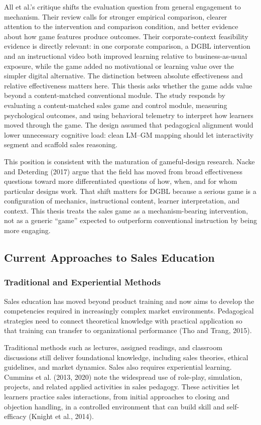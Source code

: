 \documentclass[12pt]{report}
\begin{document}
All et al.'s critique shifts the evaluation question from general engagement to mechanism. Their review calls for stronger empirical comparison, clearer attention to the intervention and comparison condition, and better evidence about how game features produce outcomes. Their corporate-context feasibility evidence is directly relevant: in one corporate comparison, a DGBL intervention and an instructional video both improved learning relative to business-as-usual exposure, while the game added no motivational or learning value over the simpler digital alternative. The distinction between absolute effectiveness and relative effectiveness matters here. This thesis asks whether the game adds value beyond a content-matched conventional module. The study responds by evaluating a content-matched sales game and control module, measuring psychological outcomes, and using behavioral telemetry to interpret how learners moved through the game. The design assumed that pedagogical alignment would lower unnecessary cognitive load: clean LM--GM mapping should let interactivity segment and scaffold sales reasoning.

This position is consistent with the maturation of gameful-design research. Nacke and Deterding (2017) argue that the field has moved from broad effectiveness questions toward more differentiated questions of how, when, and for whom particular designs work. That shift matters for DGBL because a serious game is a configuration of mechanics, instructional content, learner interpretation, and context. This thesis treats the sales game as a mechanism-bearing intervention, not as a generic ``game'' expected to outperform conventional instruction by being more engaging.

\subsection{Current Approaches to Sales Education}

\subsubsection{Traditional and Experiential Methods}
Sales education has moved beyond product training and now aims to develop the competencies required in increasingly complex market environments. Pedagogical strategies need to connect theoretical knowledge with practical application so that training can transfer to organizational performance (Tho and Trang, 2015).

Traditional methods such as lectures, assigned readings, and classroom discussions still deliver foundational knowledge, including sales theories, ethical guidelines, and market dynamics. Sales also requires experiential learning. Cummins et al. (2013, 2020) note the widespread use of role-play, simulation, projects, and related applied activities in sales pedagogy. These activities let learners practice sales interactions, from initial approaches to closing and objection handling, in a controlled environment that can build skill and self-efficacy (Knight et al., 2014).
\end{document}
